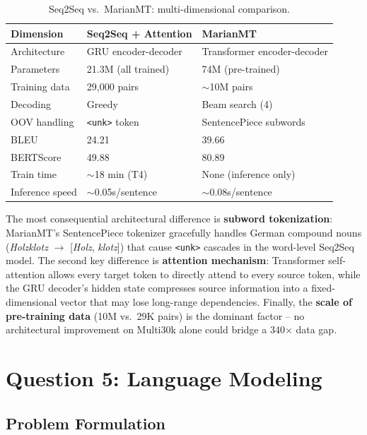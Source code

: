 \documentclass[11pt,a4paper]{article}
\begin{document}
\begin{table}[H]
\centering
\caption{Seq2Seq vs.\ MarianMT: multi-dimensional comparison.}
\label{tab:q4-comparison}
\begin{tabular}{p{}p{}p{}}
\toprule
\textbf{Dimension} & \textbf{Seq2Seq + Attention} & \textbf{MarianMT} \\
\midrule
Architecture      & GRU encoder-decoder & Transformer encoder-decoder \\
Parameters        & 21.3M (all trained)  & 74M (pre-trained) \\
Training data     & 29{,}000 pairs       & $\sim$10M pairs \\
Decoding          & Greedy               & Beam search (4) \\
OOV handling      & \texttt{<unk>} token & SentencePiece subwords \\
BLEU              & 24.21                & 39.66 \\
BERTScore         & 49.88                & 80.89 \\
Train time        & $\sim$18 min (T4)    & None (inference only) \\
Inference speed   & $\sim$0.05s/sentence & $\sim$0.08s/sentence \\
\bottomrule
\end{tabular}
\end{table}

The most consequential architectural difference is \textbf{subword
tokenization}: MarianMT's SentencePiece tokenizer gracefully handles German
compound nouns (\emph{Holzklotz} $\rightarrow$ [\emph{Holz}, \emph{klotz}])
that cause \texttt{<unk>} cascades in the word-level Seq2Seq model. The
second key difference is \textbf{attention mechanism}: Transformer
self-attention allows every target token to directly attend to every source
token, while the GRU decoder's hidden state compresses source information
into a fixed-dimensional vector that may lose long-range dependencies.
Finally, the \textbf{scale of pre-training data} (10M vs.\ 29K pairs) is
the dominant factor -- no architectural improvement on Multi30k alone could
bridge a 340$\times$ data gap.

\section{Question 5: Language Modeling}
\subsection{Problem Formulation}
\end{document}
